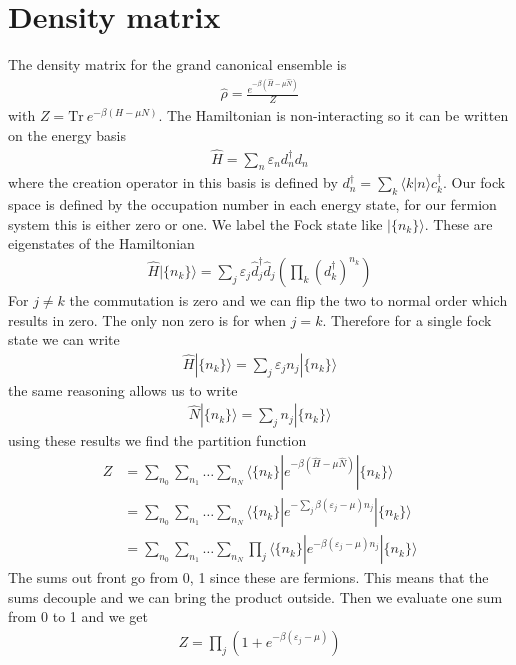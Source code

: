 \documentclass[11pt]{article}
\begin{document}
\section{Density matrix}
The density matrix for the grand canonical ensemble is
\begin{gather}
    \hat \rho = \frac{e^{-\beta(\hat H-\mu \hat N)}}{Z}
\end{gather}
with $Z = \text{Tr} ~e^{-\beta (H - \mu N)}$. The Hamiltonian is non-interacting so it can be written on the energy basis
\begin{gather}
    \hat H = \sum_n \varepsilon_n d_n^\dagger d_n 
\end{gather}
where the creation operator in this basis is defined by $d_n^{\dagger} = \sum_k \langle k|n\rangle c^\dagger_k$. Our fock space is defined by the occupation number in each energy state, for our fermion system this is either zero or one. We label the Fock state like $|\{n_k\}\rangle$. These are eigenstates of the Hamiltonian
\begin{align}
    \hat H|\{n_k\}\rangle = \sum_j \varepsilon_j \hat d_j^\dagger \hat d_j \left(\prod_k 
    \left(d_k^\dagger\right)^{n_k}\right)
\end{align}
For $j\neq k$ the commutation is zero and we can flip the two to normal order which results in zero. The only non zero is for when $j=k$. Therefore for a single fock state we can write
\begin{gather}
    \hat H|\{n_k\}\rangle = \sum_j \varepsilon_j n_j |\{n_k\}\rangle
\end{gather}
the same reasoning allows us to write
\begin{gather}
    \hat N |\{n_k\}\rangle = \sum_jn_j|\{n_k\}\rangle
\end{gather}
using these results we find the partition function
\begin{align}
    Z &= \sum_{n_0}\sum_{n_1}\ldots\sum_{n_N} \langle \{n_k\}|e^{-\beta(\hat H - \mu \hat N)}|\{n_k\}\rangle \\\nonumber
    &=\sum_{n_0}\sum_{n_1}\ldots\sum_{n_N} \langle \{n_k\}|e^{-\sum_j\beta(\varepsilon_j - \mu)n_j}|\{n_k\}\rangle \\\nonumber
    &= \sum_{n_0}\sum_{n_1}\ldots\sum_{n_N} \prod_j  \langle \{n_k\}|e^{-\beta(\varepsilon_j-\mu)n_j}|\{n_k\}\rangle
\end{align}
The sums out front go from 0, 1 since these are fermions. This means that the sums decouple and we can bring the product outside. Then we evaluate one sum from 0 to 1 and we get
\begin{gather}
    Z = \prod_j \left(1 + e^{-\beta(\varepsilon_j - \mu)}\right)
\end{gather}
\end{document}
